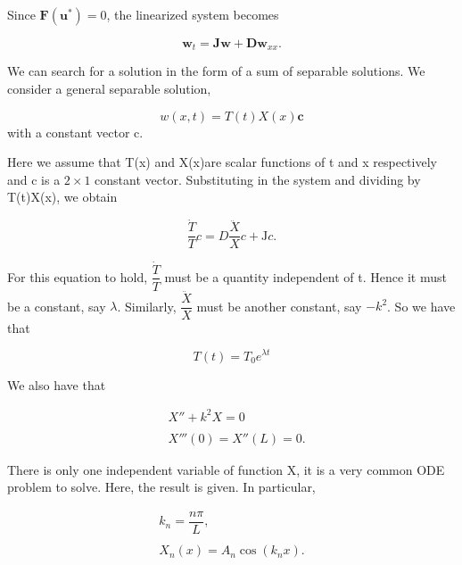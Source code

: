 \documentclass[12pt]{article}
\begin{document}
\noindent Since $\textbf{F}(\textbf{u}^*) = 0$, the linearized system becomes
\vspace{12pt}

$$
\textbf{w}_t=\textbf{Jw}+\textbf{D}\textbf{w}_{xx}.
$$
\vspace{12pt}

\noindent We can search for a solution in the form of a sum of separable solutions. We consider a general separable solution,  
\vspace{12pt}

$$
w(x,t)=T(t)X(x)\textbf{c}
$$
\noindent with a constant vector c.
\vspace{12pt}


\noindent Here we assume that T(x) and X(x)are scalar functions of t and x respectively and c is a $2\times1$ constant vector. Substituting in the system and dividing by T(t)X(x), we obtain
\vspace{12pt}

$$
\dfrac{\dot T}{T}c=D\dfrac{\ddot X}{X}c+\text{J}c.
$$
\vspace{12pt}

\noindent For this equation to hold, $\dfrac{\dot T}{T}$  must be a quantity independent of t. Hence it must be a constant, say $\lambda$. Similarly, $\dfrac{\ddot X}{X}$ must be another constant, say $-k^2$. So we have that
\vspace{12pt}

$$
T(t)=T_0e^{\lambda t}
$$
\vspace{12pt}

\noindent We also have that
\vspace{12pt}

$$
\begin{array}{ll}&X''+k^2X=0\\  
\\&X'''(0)=X''(L)=0.\end{array}
$$
\vspace{12pt}

\noindent There is only one independent variable of function X, it is a very common ODE problem to solve. Here, the result is given. In particular,
\vspace{12pt}

$$
\begin{matrix}k_n=\dfrac{n\pi}{L},\\  \\
X_n(x)=A_n\cos(k_nx).\end{matrix}
$$
\vspace{12pt}
\end{document}
